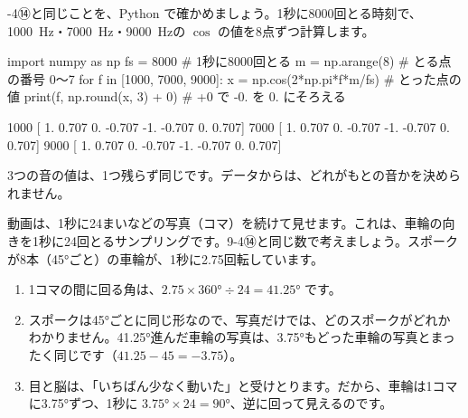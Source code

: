 -4⑭と同じことを、Python で確かめましょう。1秒に8000回とる時刻で、\qty{1000}{Hz}・\qty{7000}{Hz}・\qty{9000}{Hz}の $\cos$ の値を8点ずつ計算します。
\begin{phcode}[Python]
import numpy as np
fs = 8000                          \# 1秒に8000回とる
m = np.arange(8)                   \# とる点の番号 0〜7
for f in [1000, 7000, 9000]:
    x = np.cos(2*np.pi*f*m/fs)     \# とった点の値
    print(f, np.round(x, 3) + 0)   \# +0 で -0. を 0. にそろえる
\end{phcode}
\begin{phcodeout}
1000 [ 1.     0.707  0.    -0.707 -1.    -0.707  0.     0.707]
7000 [ 1.     0.707  0.    -0.707 -1.    -0.707  0.     0.707]
9000 [ 1.     0.707  0.    -0.707 -1.    -0.707  0.     0.707]
\end{phcodeout}
3つの音の値は、1つ残らず同じです。データからは、どれがもとの音かを決められません。

\label{ph:波-11:hatena}動画は、1秒に24まいなどの写真（コマ）を続けて見せます。これは、車輪の向きを1秒に24回とるサンプリングです。9-4⑭と同じ数で考えましょう。スポークが8本（\ang{45}ごと）の車輪が、1秒に2.75回転しています。
\begin{enumerate}[label={\bkcircled{\arabic*}}, leftmargin=2.4\zw, itemsep=1pt, topsep=2pt]
\item 1コマの間に回る角は、$2.75\times\ang{360}\div24=\ang{41.25}$ です。
\item スポークは\ang{45}ごとに同じ形なので、写真だけでは、どのスポークがどれかわかりません。\ang{41.25}進んだ車輪の写真は、\ang{3.75}もどった車輪の写真とまったく同じです（$41.25-45=-3.75$）。
\item 目と脳は、「いちばん少なく動いた」と受けとります。だから、車輪は1コマに\ang{3.75}ずつ、1秒に $\ang{3.75}\times24=\ang{90}$、逆に回って見えるのです。
\end{enumerate}

\begin{bkfigure}
\label{ph:波-11:fig-sharin}
\end{bkfigure}

